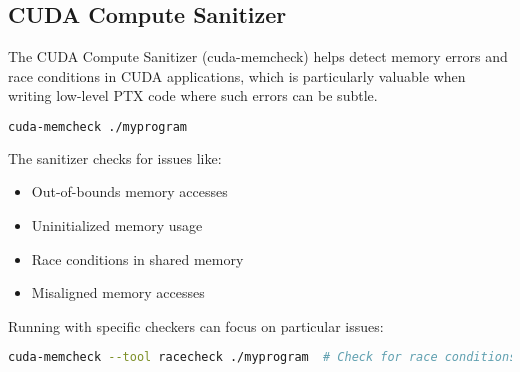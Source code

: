 \subsection{CUDA Compute Sanitizer}

The CUDA Compute Sanitizer (cuda-memcheck) helps detect memory errors and race conditions in CUDA applications, which is particularly valuable when writing low-level PTX code where such errors can be subtle.

\begin{lstlisting}[language=bash]
cuda-memcheck ./myprogram
\end{lstlisting}

The sanitizer checks for issues like:
\begin{itemize}
    \item Out-of-bounds memory accesses
    \item Uninitialized memory usage
    \item Race conditions in shared memory
    \item Misaligned memory accesses
\end{itemize}

Running with specific checkers can focus on particular issues:

\begin{lstlisting}[language=bash]
cuda-memcheck --tool racecheck ./myprogram  # Check for race conditions
\end{lstlisting}


